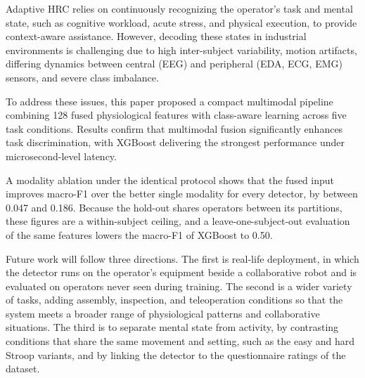 \documentclass[a4paper,twoside]{article}
\begin{document}
\noindent Adaptive \ac{HRC} relies on continuously recognizing the operator's task and mental state, such as cognitive workload, acute stress, and physical execution, to provide context-aware assistance. However, decoding these states in industrial environments is challenging due to high inter-subject variability, motion artifacts, differing dynamics between central (\ac{EEG}) and peripheral (\ac{EDA}, \ac{ECG}, \ac{EMG}) sensors, and severe class imbalance. 

To address these issues, this paper proposed a compact multimodal pipeline combining 128 fused physiological features with class-aware learning across five task conditions. Results confirm that multimodal fusion significantly enhances task discrimination, with \ac{XGBoost} delivering the strongest performance under microsecond-level latency.

A modality ablation under the identical protocol shows that the fused input improves macro-F1 over the better single modality for every detector, by between 0.047 and 0.186. Because the hold-out shares operators between its partitions, these figures are a within-subject ceiling, and a leave-one-subject-out evaluation of the same features lowers the macro-F1 of \ac{XGBoost} to 0.50.

Future work will follow three directions. The first is real-life deployment, in which the detector runs on the operator's equipment beside a collaborative robot and is evaluated on operators never seen during training. The second is a wider variety of tasks, adding assembly, inspection, and teleoperation conditions so that the system meets a broader range of physiological patterns and collaborative situations. The third is to separate mental state from activity, by contrasting conditions that share the same movement and setting, such as the easy and hard Stroop variants, and by linking the detector to the questionnaire ratings of the dataset.

{\small
    }
\end{document}
